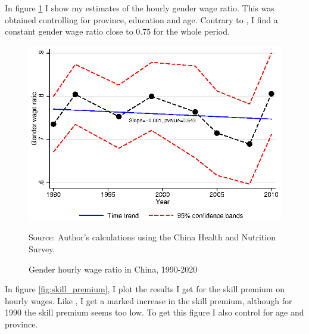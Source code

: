 \documentclass[12pt]{article}
\newcommand{\source}[1]{\caption*{Source: {#1}} }
\begin{document}
In figure \ref{fig:gender_wage_ratio} I show my estimates of the hourly gender wage ratio. This was obtained controlling for province, education and age. Contrary to \cite{getao14}, I find a constant gender wage ratio close to 0.75 for the whole period. 

\begin{figure}[hp]
	\centering
	\caption{Gender hourly wage ratio in China, 1990-2020}
	\includegraphics[width=.6\textwidth]{gender_wage_ratio}
	\label{fig:gender_wage_ratio}
	\source{Author's calculations using the China Health and Nutrition Survey.}
\end{figure}

In figure \ref{fig:skill_premium}, I plot the results I get for the skill premium on hourly wages. Like \cite{getao14}, I get a marked increase in the skill premium, although for 1990 the skill premium seems too low. To get this figure I also control for age and province.
\end{document}
